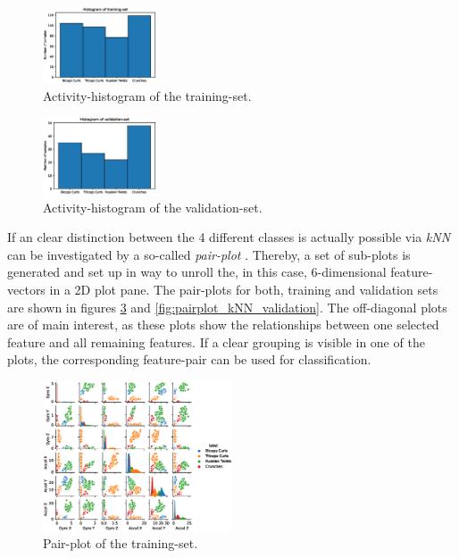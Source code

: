 \documentclass[journal]{IEEEtran}
\begin{document}
\begin{figure}[H]
    \centering
    \includegraphics[width=0.3\textwidth]{figures/hist_kNN_training.eps}
    \caption{Activity-histogram of the training-set.}
    \label{fig:hist_kNN_training}
\end{figure}

\begin{figure}[H]
    \centering
    \includegraphics[width=0.3\textwidth]{figures/hist_kNN_validation.eps}
    \caption{Activity-histogram of the validation-set.}
    \label{fig:hist_kNN_validation}
\end{figure}

If an clear distinction between the 4 different classes is actually possible via
\textit{kNN} can be investigated by a so-called \textit{pair-plot} \cite{noauthor_seabornpairplot_2021}. 
Thereby, a set of sub-plots is generated and set up in way to unroll the, 
in this case, 6-dimensional feature-vectors in a 2D plot pane. 
The pair-plots for both, training and validation sets are shown
in figures \ref{fig:pairplot_kNN_training} and
\ref{fig:pairplot_kNN_validation}. 
The off-diagonal plots are of main interest, as these plots
show the relationships between one selected feature and all remaining features.
If a clear grouping is visible in one of the plots, the corresponding
feature-pair can be used for classification.


\begin{figure}[htbp]
    \centering
    \includegraphics[width=0.5\textwidth]{figures/kNN_pairplot_training.eps}
    \caption{Pair-plot of the training-set.}
    \label{fig:pairplot_kNN_training}
\end{figure}
\end{document}
